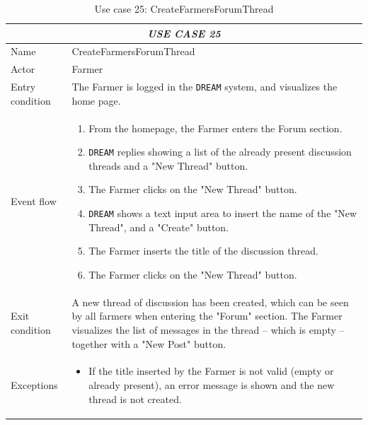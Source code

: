 \documentclass{article}
\begin{document}
\centering
\begin{longtable}{|p{3.5cm}|m{8cm}|}
\caption{Use case 25: CreateFarmersForumThread}
 \label{uc25}
 \hline
 \multicolumn{2}{|c|}{\cellcolor{white}\emph{USE CASE 25}} \\
 \endfirsthead
 \endhead
 \endfoot
 \endlastfoot
 \hline
 Name & CreateFarmersForumThread\\
 \hline
 Actor & Farmer\\
 \hline
 Entry condition & The Farmer is logged in the \verb|DREAM| system, and visualizes the home page.\\
 \hline
 Event flow & \begin{enumerate}
    \item From the homepage, the Farmer enters the Forum section.
    \item \verb|DREAM| replies showing a list of the already present discussion threads and a "New Thread" button.
    \item The Farmer clicks on the "New Thread" button.
    \item \verb|DREAM| shows a text input area to insert the name of the "New Thread",  and a "Create" button.
    \item The Farmer inserts the title of the discussion thread.
    \item The Farmer clicks on the "New Thread" button.

 \end{enumerate}\\
 \hline
 Exit condition & A new thread of discussion has been created, which can be seen by all farmers when entering the "Forum" section.
The Farmer visualizes the list of messages in the thread – which is empty – together with a "New Post" button.\\
 \hline
 Exceptions & \begin{itemize}
     \item If the title inserted by the Farmer is not valid (empty or already present), an error message is shown and the new thread is not created.
 \end{itemize}\\
 \hline
\end{longtable}
\end{document}
